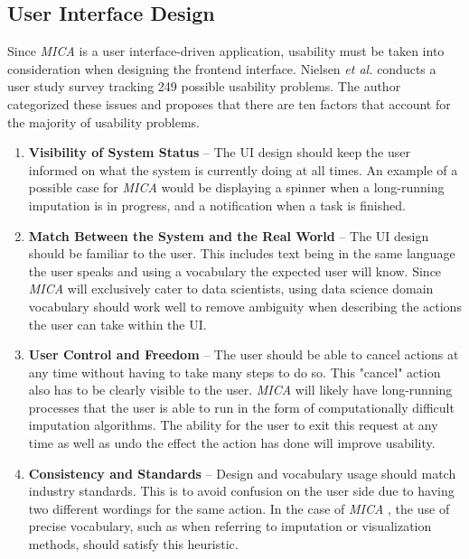 \documentclass[a4paper, 11pt]{article}
\newcommand{\etal}{\textit{et al. }}
\newcommand{\mica}{\textit{MICA }}
\begin{document}
\subsection{User Interface Design} 
Since \mica is a user interface-driven application, usability must be taken
into consideration when designing the frontend interface. Nielsen \etal
\cite{nielsen_enhancing_1994} conducts a user study survey tracking 249
possible usability problems. The author categorized these issues and proposes
that there are ten factors that account for the majority of usability problems.

\begin{enumerate}[label=\arabic*., wide=0pt, labelindent=0pt]

    \item \textbf{Visibility of System Status} -- The UI design should keep the
            user informed on what the system is currently doing at all times.
            An example of a possible case for \mica would be displaying a spinner
            when a long-running imputation is in progress, and a notification
            when a task is finished.

    \item \textbf{Match Between the System and the Real World} -- The UI design
            should be familiar to the user. This includes text being in the
            same language the user speaks and using a vocabulary the expected
            user will know. Since \mica will exclusively cater to data
            scientists, using data science domain vocabulary should work well
            to remove ambiguity when describing the actions the user can take
            within the UI. 

    \item \textbf{User Control and Freedom} -- The user should be able to
            cancel actions at any time without having to take many steps to do
            so. This "cancel" action also has to be clearly visible to the
            user. \mica will likely have long-running processes that the user
            is able to run in the form of computationally difficult imputation
            algorithms. The ability for the user to exit this request at
            any time as well as undo the effect the action has done will improve
            usability. 

    \item \textbf{Consistency and Standards} -- Design and vocabulary usage
            should match industry standards. This is to avoid confusion on the
            user side due to having two different wordings for the same action.
            In the case of \mica, the use of precise vocabulary, such as when
            referring to imputation or visualization methods, should satisfy this
            heuristic.


\end{enumerate}
\end{document}
